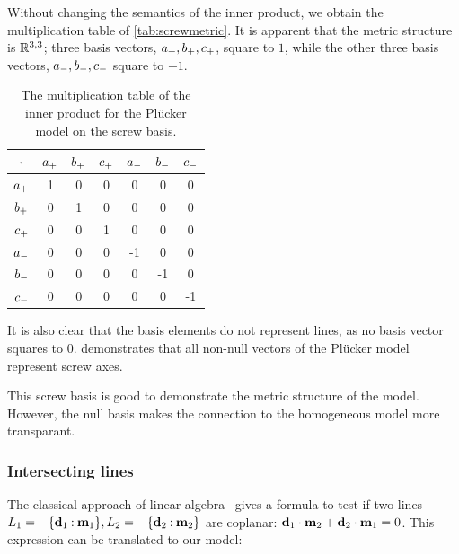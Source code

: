 Without changing the semantics of the inner product, we obtain the multiplication table of \autoref{tab:screwmetric}.  It is apparent that the metric structure is $\mathbb{R}^{3,3}$; three basis vectors, $a_{+}, b_{+}, c_{+}$, square to $1$, while the other three basis vectors, $a_{-}, b_{-}, c_{-}$ square to $-1$.  

\begin{table}[t]
  \caption{The multiplication table of the inner product for the Pl\"ucker model on the screw basis.}
  \label{tab:screwmetric}
  \begin{center}
    \begin{tabular}{|c||c|c|c|c|c|c|}
      \hline
      $\mathbin{\cdot}$ & $a_{+}$ & $b_{+}$ & $c_{+}$ & $a_{-}$ & $b_{-}$ & $c_{-}$ \\
      \hline \hline
      $a_{+}$ & 1 & 0 & 0 & 0 & 0 & 0 \\
      \hline
      $b_{+}$ & 0 & 1 & 0 & 0 & 0 & 0 \\
      \hline
      $c_{+}$ & 0 & 0 & 1 & 0 & 0 & 0 \\
      \hline
      $a_{-}$ & 0 & 0 & 0 & -1 & 0 & 0 \\
      \hline
      $b_{-}$ & 0 & 0 & 0 & 0 & -1 & 0 \\
      \hline
      $c_{-}$ & 0 & 0 & 0 & 0 & 0 & -1 \\
      \hline
    \end{tabular}
  \end{center}
\end{table}

It is also clear that the basis elements do not represent lines, as no basis vector squares to $0$.   demonstrates that all non-null vectors of the Pl\"ucker model represent screw axes.  

This screw basis is good to demonstrate the metric structure of the model.  However, the null basis makes the connection to the homogeneous model more transparant.  

\subsubsection{Intersecting lines}
The classical approach of linear algebra~\cite{Shoemake} gives a formula to test if two lines $L_1 = -\{\mathbf{d}_1 \mathbin{:} \mathbf{m}_1\}, L_2 = -\{\mathbf{d}_2 \mathbin{:} \mathbf{m}_2\}$ are coplanar: $\mathbf{d}_1 \mathbin{\cdot} \mathbf{m}_2 + \mathbf{d}_2 \mathbin{\cdot} \mathbf{m}_1 = 0$.  This expression can be translated to our model:

